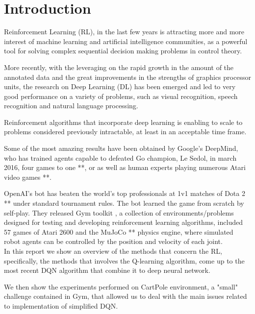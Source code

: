 \section{Introduction}

Reinforcement Learning (RL), in the last few years is attracting more and more interest of machine learning and artificial intelligence communities, as a powerful tool for solving complex sequential decision making problems in control theory.

More recently, with the leveraging on the rapid growth in the amount of the annotated data and the great improvements in the strengths of graphics processor units, the research on  Deep Learning (DL) has been emerged and led to very good performance on a variety of problems, such as visual recognition, speech recognition and natural language processing.

Reinforcement algorithms that incorporate deep learning is enabling to scale to problems considered previously intractable, at least in an acceptable time frame.

Some of the most amazing results have been obtained by Google’s DeepMind, who has trained agents capable to defeated Go champion, Le Sedol, in march 2016, four games to one **, or as well as human experts playing numerous Atari video games **.

OpenAI's bot has beaten the world's top professionals at 1v1 matches of Dota 2 ** under standard tournament rules. The bot learned the game from scratch by self-play.
They released Gym toolkit \cite{Gym}, a collection of environments/problems designed for testing and developing reinforcement learning algorithms, included 57 games of Atari 2600 and the MuJoCo ** physics engine, where simulated robot agents can be controlled by the position and velocity of each joint. \\


In this report we show an overview of the methods that concern the RL, specifically, the methods that involves the Q-learning algorithm, come up to the most recent DQN algorithm that combine it to deep neural network.

We then show the experiments performed on CartPole environment, a "small" challenge contained in Gym, that allowed us to deal with the main issues related to implementation of simplified DQN.
